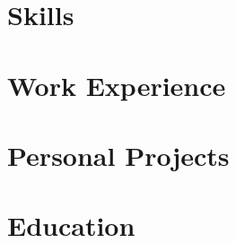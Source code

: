 \documentclass[letter,10pt]{article}
\begin{document}
% 

\section{Skills}


\section{Work Experience}


\section{Personal Projects}


\section{Education}



% 
\end{document}
